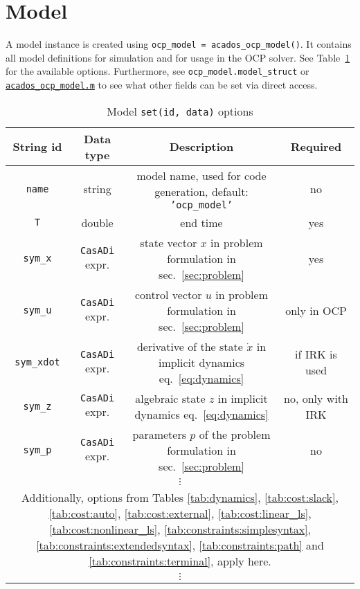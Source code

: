 \documentclass[english]{article}
\newcommand{\code}[1]{\texttt{#1}}
\newcommand{\str}[1]{\texttt{'#1'}}
\newcommand{\casadi}{\texttt{CasADi}}
\newcommand{\mandatory}{yes}
\newcommand{\optional}{no}
\begin{document}
\section{Model}\label{sec:model}
%
A model instance is created using \code{ocp\_model = acados\_ocp\_model()}. It contains all model definitions for simulation and for usage in the OCP solver.
See Table~\ref{tab:model:options} for the available options.
Furthermore, see \code{ocp\_model.model\_struct} or \href{https://github.com/acados/acados/blob/master/interfaces/acados_matlab_octave/acados_ocp_model.m}{\code{acados\_ocp\_model.m}} to see what other fields can be set via direct access.
%
\begin{table}
    \centering
    \caption{Model \code{set(id, data)} options}
    \label{tab:model:options}
    \begin{tabular}{cccc}
        \toprule
        String id & Data type & Description & Required\\
        \midrule
        \code{name} & string & model name, used for code generation, default: \str{ocp\_model} & \optional \\
        \code{T} & double & end time & \mandatory \\
        \code{sym\_x} & \casadi{} expr. & state vector $x$ in problem formulation in sec.~\ref{sec:problem} & \mandatory \\
        \code{sym\_u} & \casadi{} expr. & control vector $u$ in problem formulation in sec.~\ref{sec:problem} & only in OCP \\
        \code{sym\_xdot} & \casadi{} expr. & derivative of the state $\dot{x}$ in implicit dynamics eq.~\eqref{eq:dynamics} & if IRK is used \\
        \code{sym\_z} & \casadi{} expr. & algebraic state $z$ in implicit dynamics eq.~\eqref{eq:dynamics} & \optional, only with IRK \\
        \code{sym\_p} & \casadi{} expr. & parameters $p$ of the problem formulation in sec.~\ref{sec:problem} & \optional \\
        \multicolumn{4}{c}{$\vdots$}\\
        \multicolumn{4}{c}{Additionally, options from Tables \ref{tab:dynamics}, \ref{tab:cost:slack}, \ref{tab:cost:auto}, \ref{tab:cost:external}, \ref{tab:cost:linear_ls}, \ref{tab:cost:nonlinear_ls}, %
        \ref{tab:constraints:simplesyntax}, \ref{tab:constraints:extendedsyntax}, \ref{tab:constraints:path} and \ref{tab:constraints:terminal}, apply here.}\\
        \multicolumn{4}{c}{$\vdots$}\\
        \bottomrule
    \end{tabular}%
\end{table}%
%
\end{document}
